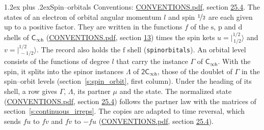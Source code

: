 \documentclass[10pt,a4paper]{article}
\makeatletter
\renewcommand\section{\@startsection{section}{1}{\z@}{-3ex plus -1ex minus -.2ex}%
  {1.2ex plus .2ex}{\normalfont\large\sffamily\bfseries\color{parttitle}}}
\numberwithin{equation}{section}
\newcommand{\grp}[1]{\mathsf{#1}}
\newcommand{\orbital}[1]{\mathrm{#1}}
\newcommand{\intx}{\mu}
\newcommand{\jm}[2]{\bigl\lvert{}^{#1}_{\,#2}\bigr\rangle}
\makeatother
\begin{document}
\section{Spin--orbitals}\label{s:spin_orbitals}
Conventions: \href{../../CONVENTIONS.pdf}{CONVENTIONS.pdf}, section \href{../../CONVENTIONS.pdf\#conv.25.4}{25.4}.
\leavevmode\label{n:index.orbital.l}The states of an electron of orbital angular momentum $l$ and spin $\nicefrac{1}{2}$ are each given up to a positive factor. \label{n:local.spinor.uv}\label{n:local.function.f}They are written in the functions $f$ of the $\orbital{s}$, $\orbital{p}$ and $\orbital{d}$ shells of \href{../../../rotation/data/pdf/Cinfh.pdf}{$\grp{C_{\infty h}}$} (\href{../../CONVENTIONS.pdf}{CONVENTIONS.pdf}, section \href{../../../rotation/CONVENTIONS.pdf\#conv.13}{13}) times the spin kets $u = \jm{1/2}{1/2}$ and $v = \jm{1/2}{-1/2}$. The record also holds the $\orbital{f}$ shell (\texttt{spinorbitals}). An orbital level consists of the functions of degree $l$ that carry the instance $\Gamma$ of \href{../../../rotation/data/pdf/Cinfh.pdf}{$\grp{C_{\infty h}}$}. With the spin, it splits into the spinor instances $\Lambda$ of $\grp{2C_{\infty h}}$, those of the doublet of $\Gamma$ in the spin--orbit levels (section~\ref{s:spin_orbit}, first column). \label{n:head.state}Under the heading of its shell, a row gives $\Gamma$, $\Lambda$, its partner $\intx$ and the state. The normalized state (\href{../../CONVENTIONS.pdf}{CONVENTIONS.pdf}, section \href{../../CONVENTIONS.pdf\#conv.25.4}{25.4}) follows the partner law with the matrices of section~\ref{s:continuous_irreps}. The copies are adapted to time reversal, which sends $f u$ to $f v$ and $f v$ to $-f u$ (\href{../../CONVENTIONS.pdf}{CONVENTIONS.pdf}, section \href{../../CONVENTIONS.pdf\#conv.25.4}{25.4}).
\end{document}
